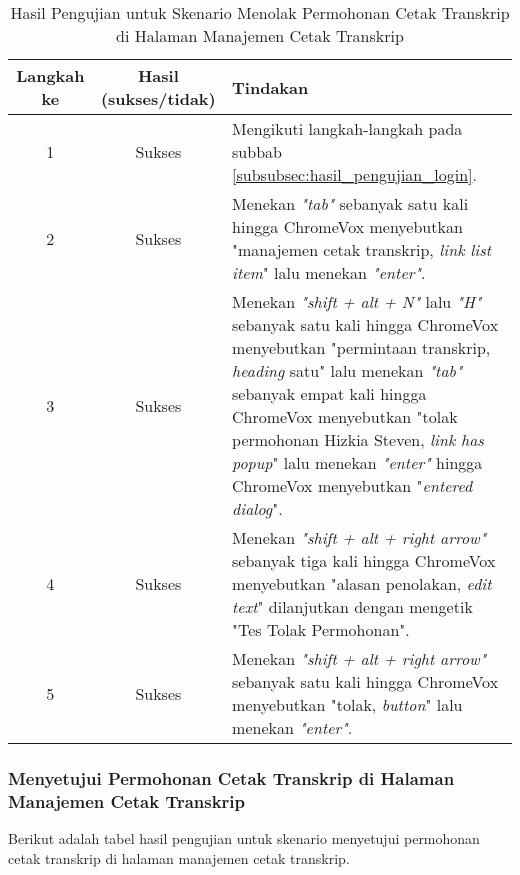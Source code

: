 \begin{table}[H]
    \centering 
    \caption{Hasil Pengujian untuk Skenario Menolak Permohonan Cetak Transkrip di Halaman Manajemen Cetak Transkrip}
    \label{tab:hasil_pengujian_menolak_permohonan_cetak_transkrip_di_halaman_manajemen_cetak_transkrip}
    \begin{tabular}{|c|c|p{10cm}|}
        \toprule
        Langkah ke & Hasil (sukses/tidak) & Tindakan \\

        \midrule
        1 & Sukses & Mengikuti langkah-langkah pada subbab \ref{subsubsec:hasil_pengujian_login}. \\
        2 & Sukses & Menekan \textit{"tab"} sebanyak satu kali hingga ChromeVox menyebutkan "manajemen cetak transkrip, \textit{link list item}" lalu menekan \textit{"enter"}. \\
        3 & Sukses & Menekan \textit{"shift + alt + N"} lalu \textit{"H"} sebanyak satu kali hingga ChromeVox menyebutkan "permintaan transkrip, \textit{heading} satu" lalu menekan \textit{"tab"} sebanyak empat kali hingga ChromeVox menyebutkan "tolak permohonan Hizkia Steven, \textit{link has popup}" lalu menekan \textit{"enter"} hingga ChromeVox menyebutkan "\textit{entered dialog}". \\
        4 & Sukses & Menekan \textit{"shift + alt + right arrow"} sebanyak tiga kali hingga ChromeVox menyebutkan "alasan penolakan, \textit{edit text}" dilanjutkan dengan mengetik "Tes Tolak Permohonan". \\
        5 & Sukses & Menekan \textit{"shift + alt + right arrow"} sebanyak satu kali hingga ChromeVox menyebutkan "tolak, \textit{button}" lalu menekan \textit{"enter"}. \\ 

        \bottomrule

    \end{tabular}
\end{table}

\subsubsection{Menyetujui Permohonan Cetak Transkrip di Halaman Manajemen Cetak Transkrip}
\label{subsubsec:hasil_pengujian_menyetujui_permohonan_cetak_transkrip_di_halaman_manajemen_cetak_transkrip}
Berikut adalah tabel hasil pengujian untuk skenario menyetujui permohonan cetak transkrip di halaman manajemen cetak transkrip.

